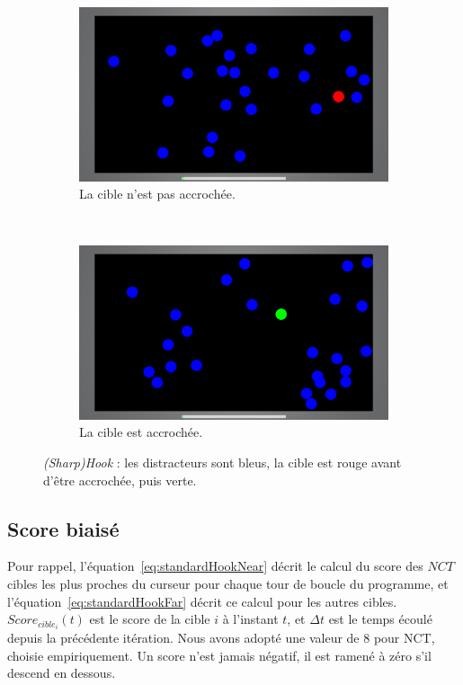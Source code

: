 	\begin{figure}[htb]
		\begin{subfigure}[t]{0.49\textwidth}
			\centering
			\includegraphics[width=\textwidth]{figures/ch5/hook_red}
			\caption{La cible n'est pas accrochée.}
			\label{fig:hook_red}
		\end{subfigure}
		~
		\begin{subfigure}[t]{0.49\textwidth}
			\centering
			\includegraphics[width=\textwidth]{figures/ch5/hook_green}
			\caption{La cible est accrochée.}
			\label{fig:hook_green}
		\end{subfigure}
		\caption[Application pour l'évaluation de \emph{SharpHook}]{\emph{(Sharp)Hook} : les distracteurs sont bleus, la cible est rouge avant d'être accrochée, puis verte.}
		\label{fig:hook_red_green}
	\end{figure}

	
	\subsection{Score biaisé}
	Pour rappel, l'équation~\ref{eq:standardHookNear} décrit le calcul du score des $NCT$ cibles les plus proches du curseur pour chaque tour de boucle du programme, et l'équation~\ref{eq:standardHookFar} décrit ce calcul pour les autres cibles. $Score_{cible_{i}}(t)$ est le score de la cible $i$ à l'instant $t$, et $\Delta{}t$ est le temps écoulé depuis la précédente itération. Nous avons adopté une valeur de 8 pour NCT, choisie empiriquement. Un score n'est jamais négatif, il est ramené à zéro s'il descend en dessous.
	
